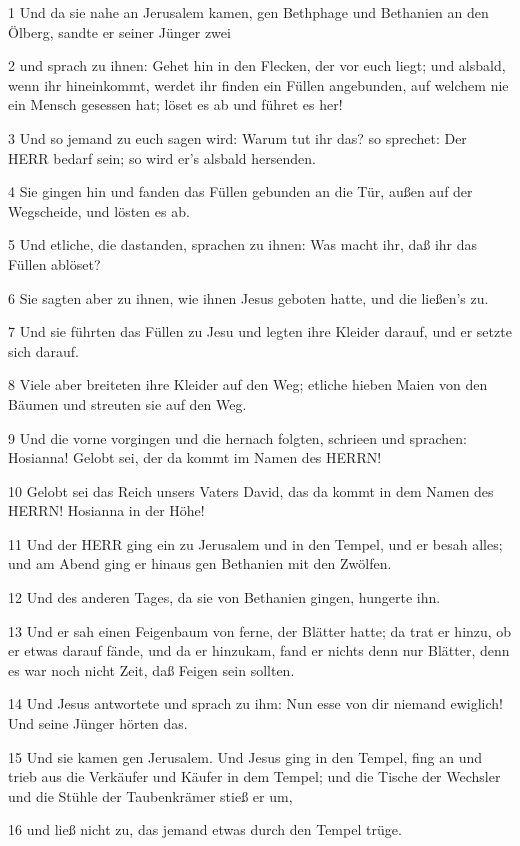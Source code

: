 \par 1 Und da sie nahe an Jerusalem kamen, gen Bethphage und Bethanien an den Ölberg, sandte er seiner Jünger zwei
\par 2 und sprach zu ihnen: Gehet hin in den Flecken, der vor euch liegt; und alsbald, wenn ihr hineinkommt, werdet ihr finden ein Füllen angebunden, auf welchem nie ein Mensch gesessen hat; löset es ab und führet es her!
\par 3 Und so jemand zu euch sagen wird: Warum tut ihr das? so sprechet: Der HERR bedarf sein; so wird er's alsbald hersenden.
\par 4 Sie gingen hin und fanden das Füllen gebunden an die Tür, außen auf der Wegscheide, und lösten es ab.
\par 5 Und etliche, die dastanden, sprachen zu ihnen: Was macht ihr, daß ihr das Füllen ablöset?
\par 6 Sie sagten aber zu ihnen, wie ihnen Jesus geboten hatte, und die ließen's zu.
\par 7 Und sie führten das Füllen zu Jesu und legten ihre Kleider darauf, und er setzte sich darauf.
\par 8 Viele aber breiteten ihre Kleider auf den Weg; etliche hieben Maien von den Bäumen und streuten sie auf den Weg.
\par 9 Und die vorne vorgingen und die hernach folgten, schrieen und sprachen: Hosianna! Gelobt sei, der da kommt im Namen des HERRN!
\par 10 Gelobt sei das Reich unsers Vaters David, das da kommt in dem Namen des HERRN! Hosianna in der Höhe!
\par 11 Und der HERR ging ein zu Jerusalem und in den Tempel, und er besah alles; und am Abend ging er hinaus gen Bethanien mit den Zwölfen.
\par 12 Und des anderen Tages, da sie von Bethanien gingen, hungerte ihn.
\par 13 Und er sah einen Feigenbaum von ferne, der Blätter hatte; da trat er hinzu, ob er etwas darauf fände, und da er hinzukam, fand er nichts denn nur Blätter, denn es war noch nicht Zeit, daß Feigen sein sollten.
\par 14 Und Jesus antwortete und sprach zu ihm: Nun esse von dir niemand ewiglich! Und seine Jünger hörten das.
\par 15 Und sie kamen gen Jerusalem. Und Jesus ging in den Tempel, fing an und trieb aus die Verkäufer und Käufer in dem Tempel; und die Tische der Wechsler und die Stühle der Taubenkrämer stieß er um,
\par 16 und ließ nicht zu, das jemand etwas durch den Tempel trüge.

